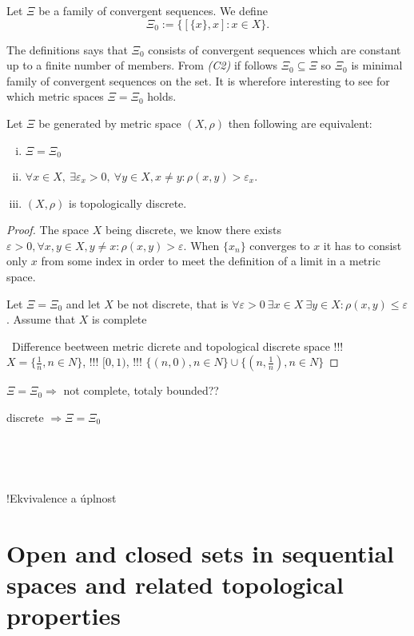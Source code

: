 \begin{define}\label{def:xi0}
Let $\Xi$ be a family of convergent sequences. We define
\[
	\Xi_0:=\bigg\{[\{x\},x] : x\in X\bigg\}.
\]
\end{define}
The definitions says that $\Xi_0$ consists of convergent sequences which are constant up to a finite number of members. From \emph{(C2)} if follows $\Xi_0\subseteq \Xi$ so $\Xi_0$ is minimal family of convergent sequences on the set. It is wherefore interesting to see for which metric spaces $\Xi=\Xi_0$ holds.

\begin{theorem} \label{th:xieqxi0}
Let $\Xi$ be generated by metric space $(X,\rho)$ then following are equivalent:
\begin{enumerate}[(i)]
	\item $\Xi=\Xi_0$
	\item $\forall x\in X,\ \exists \varepsilon_x>0,\ \forall y\in X, x\neq y: \rho(x,y)>\varepsilon_x$.
	\item $(X,\rho)$ is topologically discrete.
\end{enumerate}
\end{theorem} 

\begin{proof}
	The space $X$ being discrete, we know there exists $\varepsilon >0, \forall x,y\in X, y\neq x: \rho(x,y)>\varepsilon$.
	When $\{x_n\}$ converges to $x$ it has to consist only $x$ from some index in order to meet the definition of a limit in a metric space.
	
	Let $\Xi=\Xi_0$ and let $X$ be not discrete, that is $\forall \varepsilon>0\ \exists x\in X\ \exists y\in X: \rho(x,y)\leq \varepsilon$. Assume that $X$ is complete

\tbd\ Difference beetween metric dicrete and topological discrete space !!! $X=\{\frac{1}{n}, n\in N\}$, !!! $[0,1)$, !!! $\{(n,0), n\in N\}\cup\{(n,\frac{1}{n}), n\in N\}$
\end{proof}

$\Xi=\Xi_0 \Rightarrow$ not complete, totaly bounded??

discrete $\Rightarrow \Xi=\Xi_0$


\

\

!Ekvivalence a úplnost


\section{Open and closed sets in sequential spaces and related topological properties}

